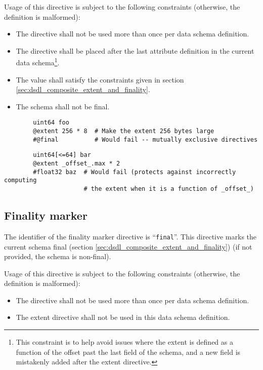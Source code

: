 Usage of this directive is subject to the following constraints (otherwise, the definition is malformed):
\begin{itemize}
    \item The directive shall not be used more than once per data schema definition.
    \item The directive shall be placed after the last attribute definition in the current data schema\footnote{%
              This constraint is to help avoid issues where the extent is defined as a function of the offset past
              the last field of the schema, and a new field is mistakenly added after the extent directive.
          }.
    \item The value shall satisfy the constraints given in section \ref{sec:dsdl_composite_extent_and_finality}.
    \item The schema shall not be final.
\end{itemize}

\begin{remark}
    \begin{verbatim}
        uint64 foo
        @extent 256 * 8  # Make the extent 256 bytes large
        #@final          # Would fail -- mutually exclusive directives
    \end{verbatim}

    \begin{verbatim}
        uint64[<=64] bar
        @extent _offset_.max * 2
        #float32 baz  # Would fail (protects against incorrectly computing
                      # the extent when it is a function of _offset_)
    \end{verbatim}
\end{remark}

\subsection{Finality marker}\label{sec:dsdl_directive_final}

The identifier of the finality marker directive is ``\verb|final|''.
This directive marks the current schema final (section \ref{sec:dsdl_composite_extent_and_finality})
(if not provided, the schema is non-final).

Usage of this directive is subject to the following constraints (otherwise, the definition is malformed):
\begin{itemize}
    \item The directive shall not be used more than once per data schema definition.
    \item The extent directive shall not be used in this data schema definition.
\end{itemize}

